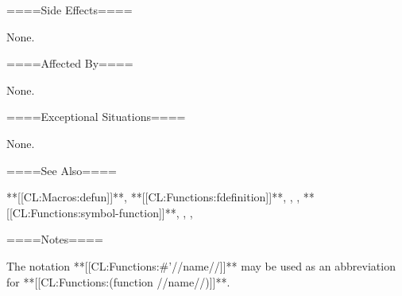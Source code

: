 ====Side Effects====

None.

====Affected By====

None.

====Exceptional Situations====

None.

====See Also====

**[[CL:Macros:defun]]**, **[[CL:Functions:fdefinition]]**, , , **[[CL:Functions:symbol-function]]**, {\secref\SymbolsAsForms}, {\secref\SharpsignQuote}, {\secref\PrintingOtherObjects}

====Notes====

The notation **[[CL:Functions:#'//name//]]** may be used as an abbreviation for **[[CL:Functions:(function //name//)]]**.

 
